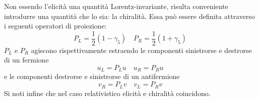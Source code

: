 \documentclass{subnucbo}
\begin{document}
Non essendo l'elicità una quantità Lorentz-invariante, risulta conveniente introdurre una quantità che lo sia: la chiralità. Essa può essere definita attraverso i seguenti operatori di proiezione:
\begin{equation}
        P _ { L } = \frac { 1 } { 2 } \left( 1 - \gamma _ { 5 } \right) \quad P _ { R } = \frac { 1 } { 2 } \left( 1 + \gamma _ { 5 } \right)
        \label{eq:plpr}
\end{equation}
$P_{L}$ e $P_{R}$ agiscono rispettivamente estraendo le componenti sinistrorse e destrorse di un fermione
\begin{equation}
        u _ { L } = P _ { L } u \quad u _ { R } = P _ { R } u
\end{equation}
e le componenti destrorse e sinistrorse di un antifermione
\begin{equation}
        v _ { R } = P _ { L } v \quad v _ { L } = P _ { R } v
\end{equation}
Si noti infine che nel caso relativistico elicità e chiralità coincidono.
\end{document}
